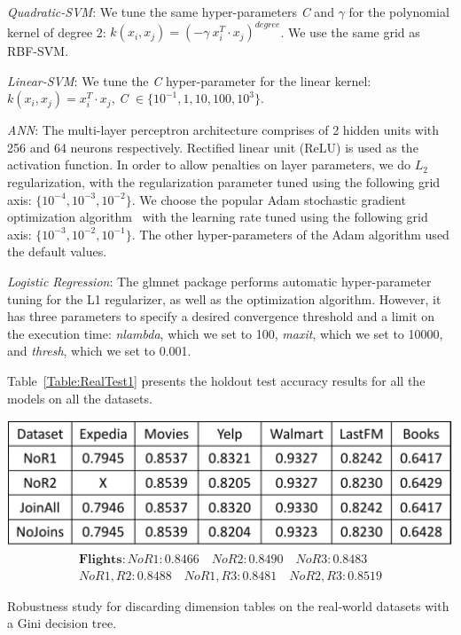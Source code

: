 \documentclass{vldb}
\begin{document}
\vspace{2mm}
\textit{Quadratic-SVM}: We tune the same hyper-parameters \textit{C} and $\gamma$ for the polynomial kernel of degree 2:
$k(x_i,x_j) = (-\gamma \  x_i ^T \cdot x_j)^{degree}$. We use the same grid as RBF-SVM.
\vspace{2mm}

\textit{Linear-SVM}: We tune the \textit{C} hyper-parameter for the linear kernel: 
$k(x_i,x_j) = x_i ^T \cdot x_j $, \textit{C} $\in \{10^{-1}, 1, 10, 100, 10^3\}$.

\vspace{2mm}
\textit{ANN}: The multi-layer perceptron architecture comprises of 2 hidden units with 256 and 64 neurons respectively. 
Rectified linear unit (ReLU) is used as the activation function. In order to allow penalties on layer parameters, we do $L_2$ regularization, with 
the regularization parameter tuned using the following grid axis: $\{ 10^{-4}, 10^{-3}, 10^{-2} \}$. We choose the popular Adam stochastic 
gradient optimization algorithm~\cite{adam} with the learning rate tuned using the following grid axis:  $\{ 10^{-3}, 10^{-2}, 10^{-1} \}$. 
The other hyper-parameters of the Adam algorithm used the default values.

\vspace{2mm}
\textit{Logistic Regression}: The glmnet package performs automatic hyper-parameter tuning for the L1 regularizer, as well as the optimization algorithm.
However, it has three parameters to specify a desired convergence threshold and a limit on the execution time: \textit{nlambda}, which we set to 100,
\textit{maxit}, which we set to 10000, and \textit{thresh}, which we set to 0.001.

Table~\ref{Table:RealTest1} presents the holdout test accuracy results for all the models on all the datasets.

\begin{table}[t]
\centering
\includegraphics[width=\columnwidth,height=\textheight,keepaspectratio]{table4.pdf}
\begin{align*}
\textbf{Flights} : NoR1: 0.8466 \quad NoR2: 0.8490 \quad NoR3: 0.8483 \\
No R1,R2: 0.8488 \quad No R1,R3: 0.8481 \quad No R2,R3: 0.8519
\end{align*}
\caption{Robustness study for discarding dimension tables on the real-world datasets with a Gini decision tree.}
\label{Table:robustness}
\end{table}
\end{document}
